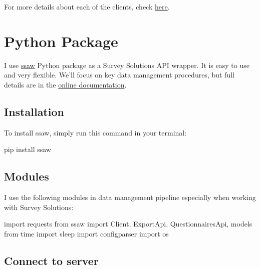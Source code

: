 \documentclass[
  letterpaper,
  DIV=11,
  numbers=noendperiod]{scrreprt}
\newenvironment{Shaded}{\begin{snugshade}}{\end{snugshade}}
\newcommand{\ImportTok}[1]{\textcolor[rgb]{0.00,0.46,0.62}{#1}}
\newcommand{\NormalTok}[1]{\textcolor[rgb]{0.00,0.23,0.31}{#1}}
\begin{document}
For more details about each of the clients, check
\href{https://docs.mysurvey.solutions/headquarters/api/survey-solutions-api/}{here}.

\section{Python Package}\label{python-package}

I use
\href{https://chatgpt.com/c/6704f64e-03fc-8012-9fcd-e574129e9878}{ssaw}
Python package as a Survey Solutions API wrapper. It is easy to use and
very flexible. We'll focus on key data management procedures, but full
details are in the
\href{https://chatgpt.com/c/6704f64e-03fc-8012-9fcd-e574129e9878}{online
documentation}.

\subsection{Installation}\label{installation}

To install ssaw, simply run this command in your terminal:

\begin{Shaded}
\begin{Highlighting}[]

\NormalTok{pip install ssaw}
\end{Highlighting}
\end{Shaded}

\subsection{Modules}\label{modules}

I use the following modules in data management pipeline especially when
working with Survey Solutions:

\begin{Shaded}
\begin{Highlighting}[]
\ImportTok{import}\NormalTok{ requests}
\ImportTok{from}\NormalTok{ ssaw }\ImportTok{import}\NormalTok{ Client, ExportApi, QuestionnairesApi, models}
\ImportTok{from}\NormalTok{ time }\ImportTok{import}\NormalTok{ sleep}
\ImportTok{import}\NormalTok{ configparser}
\ImportTok{import}\NormalTok{ os}
\end{Highlighting}
\end{Shaded}

\subsection{Connect to server}\label{connect-to-server}
\end{document}
